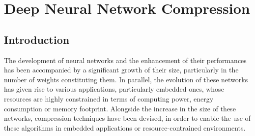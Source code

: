 \chapter{Deep Neural Network Compression}
\label{chap:sota}

\localtableofcontents

\section{Introduction}\label{sec:sota:intro}

The development of neural networks and the enhancement of their performances has
been accompanied by a significant growth of their size, particularly in the
number of weights constituting them. In parallel, the evolution of these
networks has given rise to various applications, particularly embedded ones,
whose resources are highly constrained in terms of computing power, energy
consumption or memory footprint. Alongside the increase in the size of these
networks, compression techniques have been devised, in order to enable the use
of these algorithms in embedded applications or resource-contrained
environments.\\


